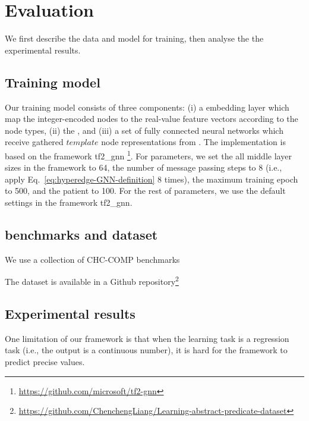 
% 


\section{Evaluation} \label{section:evaluation}
We first describe the data and model for training, then analyse the the experimental results. 


\subsection{Training model}
Our training model consists of three components: (i) a embedding layer which map the integer-encoded nodes to the real-value feature vectors according to the node types, (ii) the \hyperedgeGNN, and (iii) a set of fully connected neural networks which receive gathered $\textit{template}$ node representations from \hyperedgeGNNs.
The implementation is based on the framework tf2\_gnn \footnote{\url{https://github.com/microsoft/tf2-gnn}}. For parameters, we set the all middle layer sizes in the framework to 64, the number of message passing steps to 8 (i.e., apply Eq.~\ref{eq:hyperedge-GNN-definition} 8 times), the maximum training epoch to 500, and the patient to 100. For the rest of parameters, we use the default settings in the framework tf2\_gnn. 


\subsection{benchmarks and dataset}
We use a collection of CHC-COMP benchmarks~\cite{chcBenchmark}

The dataset is available in a Github repository\footnote{\url{https://github.com/ChenchengLiang/Learning-abstract-predicate-dataset}}

\subsection{Experimental results}




One limitation of our framework is that when the learning task is a regression task (i.e., the output is a continuous number), it is hard for the framework to predict precise values. 


% 


